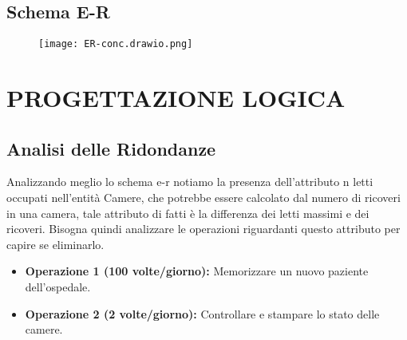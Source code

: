 \documentclass[a4paper, 10pt]{article}
\begin{document}
\subsection{Schema E-R}
\begin{figure}[H]
    \texttt{[image: ER-conc.drawio.png]}
\end{figure}

\section{PROGETTAZIONE LOGICA}
\subsection{Analisi delle Ridondanze}
Analizzando meglio lo schema e-r notiamo la presenza dell'attributo n letti occupati nell'entità Camere, che potrebbe essere calcolato dal numero di ricoveri in una camera, tale attributo di fatti è la differenza dei letti massimi e dei ricoveri.
Bisogna quindi analizzare le operazioni riguardanti questo attributo per capire se eliminarlo.

\begin{itemize}
    \item \textbf{Operazione 1 (100 volte/giorno):} Memorizzare un nuovo paziente dell'ospedale.
    \item \textbf{Operazione 2 (2 volte/giorno):} Controllare e stampare lo stato delle camere.
\end{itemize}
\end{document}
